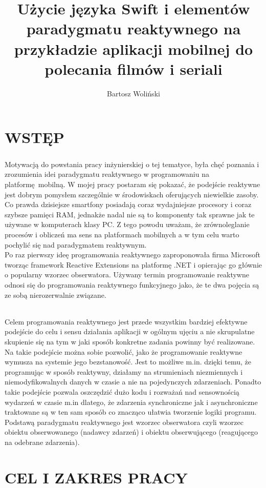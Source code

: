 \documentclass[11pt,twoside,a4paper]{report}
\title{Użycie języka Swift i elementów paradygmatu reaktywnego na przykładzie aplikacji mobilnej do polecania filmów i seriali}
\author{Bartosz Woliński}
\begin{document}
\maketitle
\tableofcontents
\chapter{WSTĘP}

\paragraph{}Motywacją do powstania pracy inżynierskiej o tej tematyce, była chęć poznania i zrozumienia idei paradygmatu reaktywnego w programowaniu na platformę mobilną. W mojej pracy postaram się pokazać, że podejście reaktywne jest dobrym pomysłem szczególnie w środowiskach oferujących niewielkie zasoby. Co prawda dzisiejsze smartfony posiadają coraz wydajniejsze procesory i coraz szybsze pamięci RAM, jednakże nadal nie są to komponenty tak sprawne jak te używane w komputerach klasy PC. Z tego powodu uważam, że zrównoleglanie procesów i obliczeń ma sens na platformach mobilnych a w tym celu warto pochylić się nad paradygmatem reaktywnym.\\ Po raz pierwszy ideę programowania reaktywnego zaproponowała firma Microsoft tworząc framework Reactive Extensions na platformę .NET i opierając go głównie o popularny wzorzec obserwatora.\cite{MicrosoftRx} 
Używany termin programowanie reaktywne odnosi się do programowania reaktywnego funkcyjnego jako, że te dwa pojęcia są ze sobą nierozerwalnie związane.
\subparagraph{}Celem programowania reaktywnego jest przede wszystkim bardziej efektywne podejście do celu i sensu działania aplikacji w ogólnym ujęciu a nie skrupulatne skupienie się na tym w jaki sposób konkretne zadania powinny być realizowane. Na takie podejście można sobie pozwolić, jako że programowanie reaktywne wymusza na systemie jego bezstanowość. Jest to możliwe m.in. dzięki temu, że programując w sposób reaktywny, działamy na strumieniach niezmiennych i niemodyfikowalnych danych w czasie a nie na pojedynczych zdarzeniach. Ponadto takie podejście pozwala oszczędzić dużo kodu i rozważań nad sensownością wydarzeń w czasie m.in dlatego, że zdarzenia synchroniczne jak i asynchroniczne traktowane są w ten sam sposób co znacząco ułatwia tworzenie logiki programu. Podstawą paradygmatu reaktywnego jest wzorzec obserwatora czyli wzorzec obiektu obserwowanego (nadawcy zdarzeń) i obiektu obserwującego (reagującego na odebrane zdarzenia).
\chapter{CEL I ZAKRES PRACY}
\end{document}
